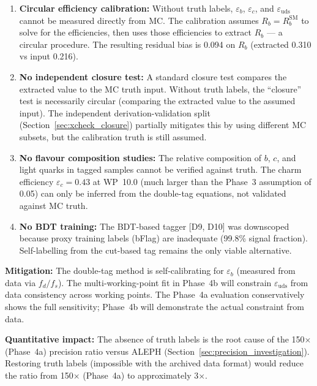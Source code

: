 \documentclass[11pt,a4paper]{article}
\begin{document}
\begin{enumerate}
\item \textbf{Circular efficiency calibration:} Without truth labels, $\varepsilon_b$,
$\varepsilon_c$, and $\varepsilon_\mathrm{uds}$ cannot be measured directly from MC.
The calibration assumes $R_b = R_b^\mathrm{SM}$ to solve for the efficiencies, then
uses those efficiencies to extract $R_b$ --- a circular procedure. The resulting
residual bias is 0.094 on $R_b$ (extracted 0.310 vs input 0.216).

\item \textbf{No independent closure test:} A standard closure test compares the
extracted value to the MC truth input. Without truth labels, the ``closure'' test
is necessarily circular (comparing the extracted value to the assumed input). The
independent derivation-validation split (Section~\ref{sec:xcheck_closure}) partially
mitigates this by using different MC subsets, but the calibration truth is still
assumed.

\item \textbf{No flavour composition studies:} The relative composition of $b$, $c$,
and light quarks in tagged samples cannot be verified against truth. The charm
efficiency $\varepsilon_c = 0.43$ at WP~10.0 (much larger than the Phase~3 assumption
of 0.05) can only be inferred from the double-tag equations, not validated against
MC truth.

\item \textbf{No BDT training:} The BDT-based tagger [D9, D10] was downscoped
because proxy training labels (bFlag) are inadequate (99.8\% signal fraction).
Self-labelling from the cut-based tag remains the only viable alternative.
\end{enumerate}

\textbf{Mitigation:} The double-tag method is self-calibrating for $\varepsilon_b$
(measured from data via $f_d / f_s$). The multi-working-point fit in Phase~4b will
constrain $\varepsilon_\mathrm{uds}$ from data consistency across working points.
The Phase~4a evaluation conservatively shows the full sensitivity; Phase~4b will
demonstrate the actual constraint from data.

\textbf{Quantitative impact:} The absence of truth labels is the root cause of
the 150$\times$ (Phase~4a) precision ratio versus ALEPH (Section~\ref{sec:precision_investigation}).
Restoring truth labels (impossible with the archived data format) would reduce the
ratio from 150$\times$ (Phase~4a) to approximately 3$\times$.
\end{document}
